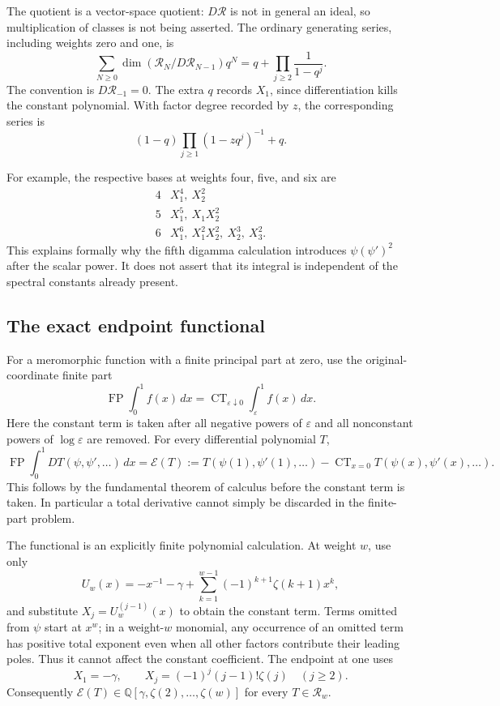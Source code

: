 \documentclass[11pt,a4paper]{article}
\numberwithin{equation}{section}
\theoremstyle{plain}
\theoremstyle{definition}
\theoremstyle{remark}
\begin{document}
The quotient is a vector-space quotient: $D\mathscr R$ is not in
general an ideal, so multiplication of classes is not being asserted.
The ordinary generating series, including weights zero and one, is
\begin{equation}\label{dq:Hilbert}
 \sum_{N\ge0}\dim(\mathscr R_N/D\mathscr R_{N-1})q^N
 =q+\prod_{j\ge2}\frac1{1-q^j}.
\end{equation}
The convention is $D\mathscr R_{-1}=0$. The extra $q$ records
$X_1$, since differentiation kills the constant polynomial.
With factor degree recorded by $z$, the corresponding series is
\[
 (1-q)\prod_{j\ge1}(1-zq^j)^{-1}+q.
\]

For example, the respective bases at weights four, five, and six are
\[
 \begin{array}{c|l}
 4& X_1^4,\ X_2^2\\
 5& X_1^5,\ X_1X_2^2\\
 6& X_1^6,\ X_1^2X_2^2,\ X_2^3,\ X_3^2.
 \end{array}
\]
This explains formally why the fifth digamma calculation introduces
$\psi(\psi')^2$ after the scalar power. It does not assert that its
integral is independent of the spectral constants already present.

\subsection{The exact endpoint functional}

For a meromorphic function with a finite principal part at zero, use
the original-coordinate finite part
\[
 \operatorname{FP}\int_0^1f(x)\,dx
 =\operatorname{CT}_{\varepsilon\downarrow0}\int_\varepsilon^1 f(x)\,dx.
\]
Here the constant term is taken after all negative powers of
$\varepsilon$ and all nonconstant powers of $\log\varepsilon$ are removed.
For every differential polynomial $T$,
\begin{equation}\label{dq:endpointfunctional}
 \operatorname{FP}\int_0^1 DT(\psi,\psi',\ldots)\,dx
 =\mathcal E(T):=T(\psi(1),\psi'(1),\ldots)
          -\operatorname{CT}_{x=0}T(\psi(x),\psi'(x),\ldots).
\end{equation}
This follows by the fundamental theorem of calculus before the constant
term is taken. In particular a total derivative cannot simply be
discarded in the finite-part problem.

The functional is an explicitly finite polynomial calculation. At
weight $w$, use only
\begin{equation}\label{dq:endpointtruncation}
 U_w(x)=-x^{-1}-\gamma+
       \sum_{k=1}^{w-1}(-1)^{k+1}\zeta(k+1)x^k,
\end{equation}
and substitute $X_j=U_w^{(j-1)}(x)$ to obtain the constant term.
Terms omitted from $\psi$ start at $x^w$; in a weight-$w$ monomial,
any occurrence of an omitted term has positive total exponent even
when all other factors contribute their leading poles. Thus it cannot
affect the constant coefficient. The endpoint at one uses
\[
 X_1=-\gamma,\qquad X_j=(-1)^j(j-1)!\zeta(j)\quad(j\ge2).
\]
Consequently $\mathcal E(T)\in\mathbb Q[\gamma,\zeta(2),\ldots,\zeta(w)]$
for every $T\in\mathscr R_w$.
\end{document}
